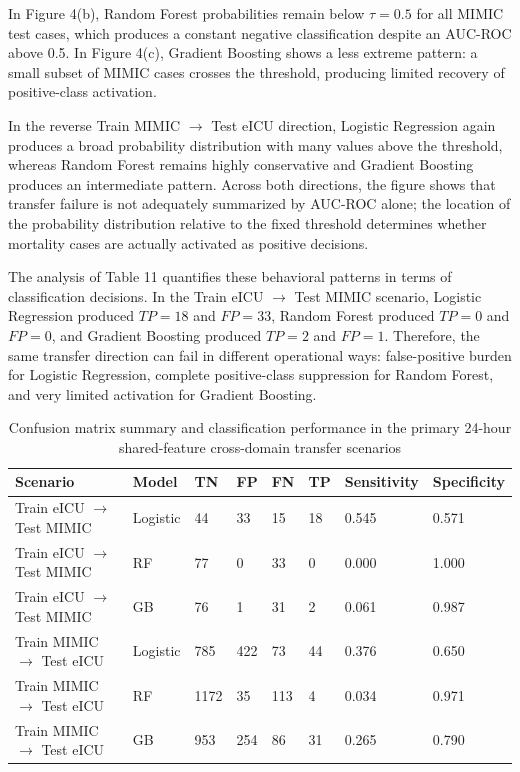 \documentclass[utf8]{FrontiersinHarvard} %
\begin{document}
In Figure 4(b), Random Forest probabilities remain below $\tau=0.5$ for all MIMIC test cases, which produces a constant negative classification despite an AUC-ROC above 0.5. In Figure 4(c), Gradient Boosting shows a less extreme pattern: a small subset of MIMIC cases crosses the threshold, producing limited recovery of positive-class activation.

In the reverse Train MIMIC $\rightarrow$ Test eICU direction, Logistic Regression again produces a broad probability distribution with many values above the threshold, whereas Random Forest remains highly conservative and Gradient Boosting produces an intermediate pattern. Across both directions, the figure shows that transfer failure is not adequately summarized by AUC-ROC alone; the location of the probability distribution relative to the fixed threshold determines whether mortality cases are actually activated as positive decisions.

The analysis of Table 11 quantifies these behavioral patterns in terms of classification decisions. In the Train eICU $\rightarrow$ Test MIMIC scenario, Logistic Regression produced $TP=18$ and $FP=33$, Random Forest produced $TP=0$ and $FP=0$, and Gradient Boosting produced $TP=2$ and $FP=1$. Therefore, the same transfer direction can fail in different operational ways: false-positive burden for Logistic Regression, complete positive-class suppression for Random Forest, and very limited activation for Gradient Boosting.

\begin{table}[h]
	\caption{Confusion matrix summary and classification performance in the primary 24-hour shared-feature cross-domain transfer scenarios}
	\label{tab:decision_space_analysis}
	\setlength{\tabcolsep}{3pt}
	\begin{tabular}{p{145pt}p{50pt}p{35pt}p{35pt}p{35pt}p{35pt}p{55pt}p{55pt}}
		\hline
		\textbf{Scenario} & \textbf{Model} & \textbf{TN} & \textbf{FP} & \textbf{FN} & \textbf{TP} & \textbf{Sensitivity} & \textbf{Specificity} \\ \hline

		Train eICU $\rightarrow$ Test MIMIC & Logistic & 44 & 33 & 15 & 18 & 0.545 & 0.571 \\
		Train eICU $\rightarrow$ Test MIMIC & RF & 77 & 0 & 33 & 0 & 0.000 & 1.000 \\
		Train eICU $\rightarrow$ Test MIMIC & GB & 76 & 1 & 31 & 2 & 0.061 & 0.987 \\

		Train MIMIC $\rightarrow$ Test eICU & Logistic & 785 & 422 & 73 & 44 & 0.376 & 0.650 \\
		Train MIMIC $\rightarrow$ Test eICU & RF & 1172 & 35 & 113 & 4 & 0.034 & 0.971 \\
		Train MIMIC $\rightarrow$ Test eICU & GB & 953 & 254 & 86 & 31 & 0.265 & 0.790 \\ \hline

	\end{tabular}
	\footnotesize
\end{table}
\end{document}
